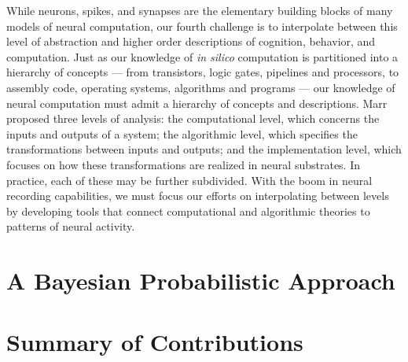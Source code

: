 While neurons, spikes, and synapses are the elementary building blocks
of many models of neural computation, our fourth challenge is to
interpolate between this level of abstraction and higher order
descriptions of cognition, behavior, and computation.  Just as our
knowledge of \emph{in silico} computation is partitioned into a
hierarchy of concepts --- from transistors, logic gates, pipelines and
processors, to assembly code, operating systems, algorithms and
programs --- our knowledge of neural computation must admit a hierarchy
of concepts and descriptions.  Marr proposed three levels of analysis:
the computational level, which concerns the inputs and outputs of a
system; the algorithmic level, which specifies the transformations
between inputs and outputs; and the implementation level, which
focuses on how these transformations are realized in neural
substrates. In practice, each of these may be further subdivided. 
With the boom in neural recording capabilities, we must focus our efforts
on interpolating between levels by developing tools that connect
computational and algorithmic theories to patterns of neural activity.


\section{A Bayesian Probabilistic Approach} 


\section{Summary of Contributions}
